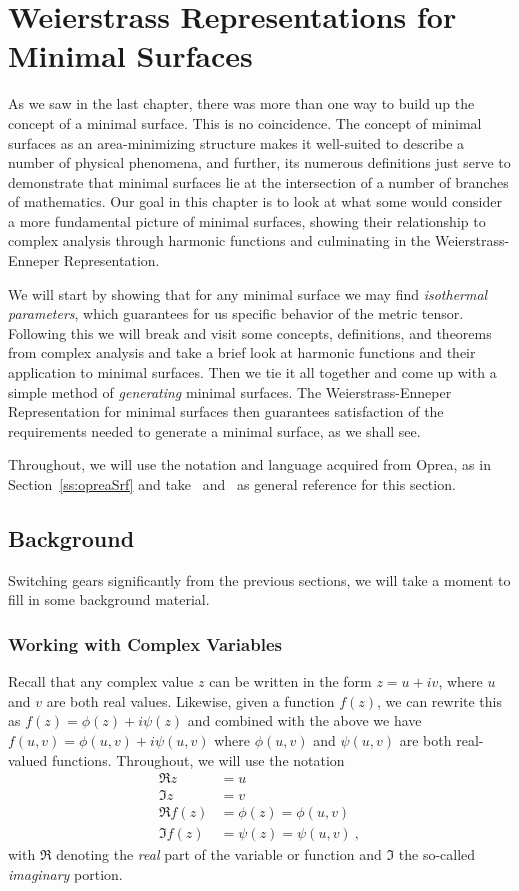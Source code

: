 \section{Weierstrass Representations for Minimal Surfaces}

  As we saw in the last chapter, there was more than one way to build up the concept of a minimal surface. This is no coincidence. The concept of minimal surfaces as an area-minimizing structure makes it well-suited to describe a number of physical phenomena, and further, its numerous definitions just serve to demonstrate that minimal surfaces lie at the intersection of a number of branches of mathematics. Our goal in this chapter is to look at what some would consider a more fundamental picture of minimal surfaces, showing their relationship to complex analysis through harmonic functions and culminating in the Weierstrass-Enneper Representation.

  We will start by showing that for any minimal surface we may find \emph{isothermal parameters}, which guarantees for us specific behavior of the metric tensor. Following this we will break and visit some concepts, definitions, and theorems from complex analysis and take a brief look at harmonic functions and their application to minimal surfaces. Then we tie it all together and come up with a simple method of \emph{generating} minimal surfaces. The Weierstrass-Enneper Representation for minimal surfaces then guarantees satisfaction of the requirements needed to generate a minimal surface, as we shall see.

  Throughout, we will use the notation and language acquired from Oprea, as in Section~\ref{ss:opreaSrf} and take~\cite{Opr07} and~\cite{Opr00} as general reference for this section.

\subsection{Background}
  Switching gears significantly from the previous sections, we will take a moment to fill in some background material.

  \subsubsection{Working with Complex Variables}
    Recall that any complex value $z$ can be written in the form $z = u + iv$, where $u$ and $v$ are both real values. Likewise, given a function $f(z)$, we can rewrite this as $f(z) = \phi(z) + i\psi(z)$ and combined with the above we have $f(u, v) = \phi(u, v) + i \psi(u, v)$ where $\phi(u, v)$ and $\psi(u, v)$ are both real-valued functions. Throughout, we will use the notation
    \begin{align*}
      \Re z &= u\\
      \Im z &= v\\
      \Re f(z) &= \phi(z) = \phi(u, v)\\
      \Im f(z) &= \psi(z) = \psi(u, v) \ , 
    \end{align*}
    with $\Re$ denoting the \emph{real} part of the variable or function and $\Im$ the so-called \emph{imaginary} portion.

